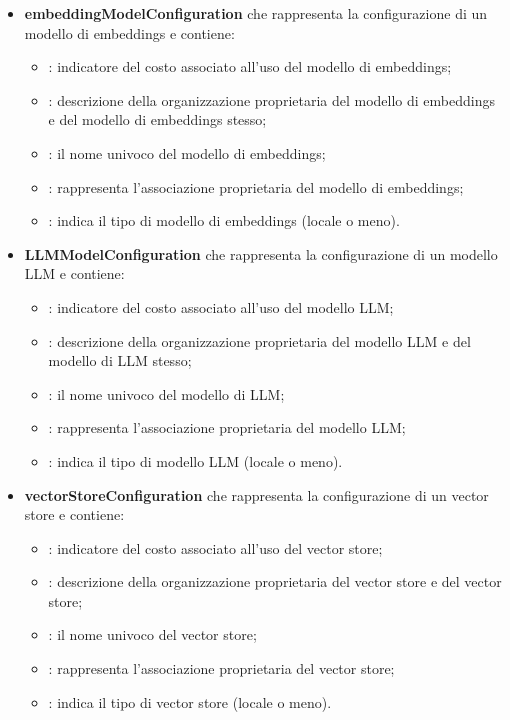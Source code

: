 \documentclass[10pt, a4paper]{article}
\begin{document}
\begin{itemize}
    \item \textbf{embeddingModelConfiguration} che rappresenta la configurazione di un modello di embeddings e contiene:
    \begin{itemize}
        \item {}: indicatore del costo associato all'uso del modello di embeddings;
         \item {}: descrizione della organizzazione proprietaria del modello di embeddings e del modello di embeddings stesso;
        \item {}: il nome univoco del modello di embeddings;
        \item {}: rappresenta l'associazione proprietaria del modello di embeddings;
        \item {}: indica il tipo di modello di embeddings (locale o meno).\\
    \end{itemize}

\item \textbf{LLMModelConfiguration} che rappresenta la configurazione di un modello LLM e contiene:
    \begin{itemize}
        \item {}: indicatore del costo associato all'uso del modello LLM;
         \item {}: descrizione della organizzazione proprietaria del modello LLM e del modello di LLM stesso;
        \item {}: il nome univoco del modello di LLM;
        \item {}: rappresenta l'associazione proprietaria del modello LLM;
        \item {}: indica il tipo di modello LLM (locale o meno).\\
    \end{itemize}
    
\item \textbf{vectorStoreConfiguration} che rappresenta la configurazione di un vector store e contiene:
    \begin{itemize}
        \item {}: indicatore del costo associato all'uso del vector store;
         \item {}: descrizione della organizzazione proprietaria del vector store e del vector store;
        \item {}: il nome univoco del vector store;
        \item {}: rappresenta l'associazione proprietaria del vector store;
        \item {}: indica il tipo di vector store (locale o meno).\\
    \end{itemize}
    \end{itemize}
\end{document}

